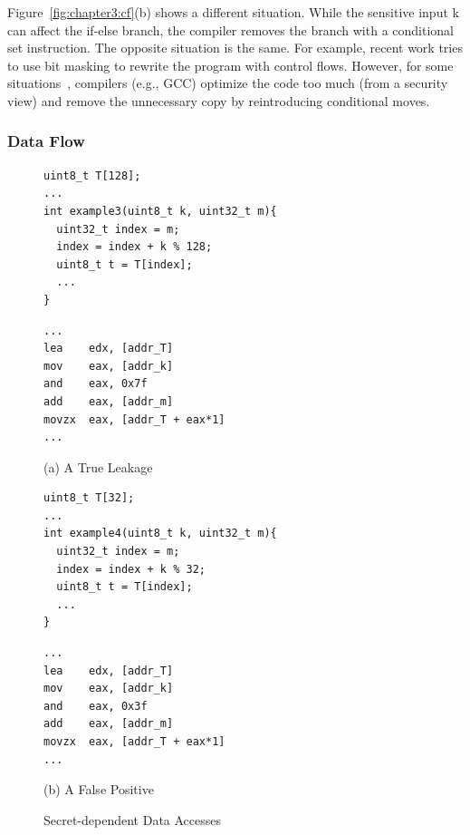 Figure~\ref{fig:chapter3:cf}(b) shows a different situation. While the sensitive input \textsf{k} can affect the if-else branch, the compiler removes the branch with a conditional set instruction.  The opposite situation is the same. For example, recent work tries to use bit masking to rewrite the program with control flows. However, for some situations~\cite{Coppens:2009:PMT:1607723.1608124}, compilers (e.g., GCC) optimize the code too much (from a security view) and remove the unnecessary copy by reintroducing conditional moves.
\subsubsection{Data Flow}
\begin{figure}[h]
\begin{minipage}{0.4\linewidth}
\begin{lstlisting}[xleftmargin=.0\textwidth, xrightmargin=.0\textwidth, frame=none]
uint8_t T[128];
...
int example3(uint8_t k, uint32_t m){
  uint32_t index = m;
  index = index + k % 128;
  uint8_t t = T[index];
  ...
}
\end{lstlisting}
\end{minipage}
\hfill
\begin{minipage}{0.4\linewidth}
\begin{lstlisting}[xleftmargin=.0\textwidth, xrightmargin=.00\textwidth, frame=none, numbers=none, mathescape=true]
...
lea    edx, [addr_T]
mov    eax, [addr_k]
and    eax, 0x7f
add    eax, [addr_m]
movzx  eax, [addr_T + eax*1]
...
\end{lstlisting}
\end{minipage}\caption*{(a) A True Leakage}

\begin{minipage}{0.4\linewidth}
\begin{lstlisting}[xleftmargin=.0\textwidth, xrightmargin=.0\textwidth, frame=none]
uint8_t T[32];
...
int example4(uint8_t k, uint32_t m){
  uint32_t index = m;
  index = index + k % 32;
  uint8_t t = T[index];
  ...
}
\end{lstlisting}
\end{minipage}
\hfill
\begin{minipage}{0.4\linewidth}
\begin{lstlisting}[xleftmargin=.0\textwidth, xrightmargin=.00\textwidth, frame=none, numbers=none, mathescape=true]
...
lea    edx, [addr_T]
mov    eax, [addr_k]
and    eax, 0x3f
add    eax, [addr_m]
movzx  eax, [addr_T + eax*1]
...
\end{lstlisting}
\end{minipage}\caption*{(b) A False Positive}
\caption{Secret-dependent Data Accesses}\label{fig:chapter3:da}
\end{figure}

